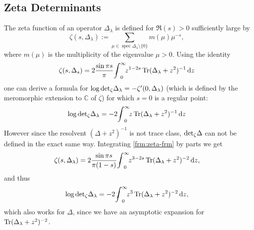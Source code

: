 \subsection{Zeta Determinants}
The zeta function of an operator $\Delta_\lambda$ is defined for $\Re(s) > 0$
sufficiently large by
\begin{equation}
  \zeta(s,\Delta_\lambda) :=
  \sum_{\mu\in\operatorname{spec}\Delta_\lambda\setminus\{0\}} m(\mu)\mu^{-s},
\end{equation}
where $m(\mu)$ is the multiplicity of the eigenvalue $\mu > 0$. Using the
identity %
\begin{equation}
  \label{frm:zeta-frm}
  \zeta(s,\Delta_s) = 2 \frac{\sin\pi
  s}{\pi}\Regint[0]{z}{z^{1-2s}\Tr(\Delta_\lambda + z^2)^{-1}}
\end{equation}
one can derive a formula for $\log\zdet\Delta_\lambda =
-\zeta'(0,\Delta_\lambda)$ (which is defined by the meromorphic extension to
$\mathbb{C}$ of $\zeta$) for which $s=0$ is a regular point:
\begin{align}
  \log\zdet\Delta_\lambda = -2\Regint[0]{z}{z\Tr(\Delta_\lambda + z^2)^{-1}}
\end{align}
However since the resolvent $(\Delta + z^2)^{-1}$ is not trace class,
$\zdet\Delta$ can not be defined in the exact same way. Integrating
\cref{frm:zeta-frm} by parts we get
\begin{equation*}
  \zeta(s,\Delta_\lambda) = 2\frac{\sin\pi
  s}{\pi(1-s)}\Regint[0]{z}{z^{3-2s}\Tr(\Delta_\lambda + z^2)^{-2}},
\end{equation*}
and thus
\begin{equation*}
  \log\zdet\Delta_\lambda = -2 \Regint[0]{z}{z^3\Tr(\Delta_\lambda + z^2)^{-2}},
\end{equation*}
which also works for $\Delta$, since we have an asymptotic expansion for
$\Tr(\Delta_\lambda + z^2)^{-2}$.

